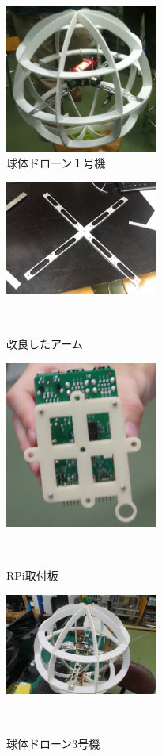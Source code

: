 \documentclass[a4paper]{jarticle}
\begin{document}
\begin{figure}[b]
 \begin{center}
  \includegraphics[width=50mm]{image/1.JPG}
  \caption{球体ドローン１号機}
  \label{fig:1}
 \end{center}
\end{figure}

\begin{figure}[b]
 \begin{center}
  \includegraphics[width=50mm]{image/arm-2.JPG}
 　\caption{改良したアーム}
 　\label{fig:arm}
 \end{center}
\end{figure}

\begin{figure}[b]
 \begin{center}
  \includegraphics[width=50mm]{image/RPi-board-1.JPG}
 　\caption{RPi取付板}
 　\label{fig:RPi-board}
 \end{center}
\end{figure}

\begin{figure}[b]
 \begin{center}
  \includegraphics[width=50mm]{image/3.JPG}
 　\caption{球体ドローン3号機}
 　\label{fig:3}
 \end{center}
\end{figure}
\end{document}
